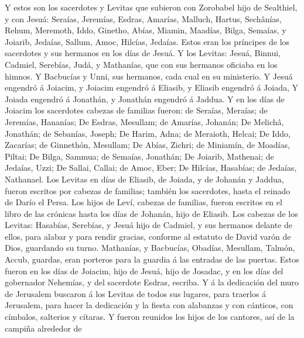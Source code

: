  Y estos son los sacerdotes y Levitas que subieron con
Zorobabel hijo de Sealthiel, y con Jesuá: Seraías, Jeremías, Esdras,
 Amarías, Malluch, Hartus,  Sechânías, Rehum,
Meremoth,  Iddo, Ginetho, Abías,  Miamin,
Maadías, Bilga,  Semaías, y Joiarib, Jedaías, 
Sallum, Amoc, Hilcías, Jedaías. Estos eran los príncipes de los
sacerdotes y sus hermanos en los días de Jesuá.  Y los
Levitas: Jesuá, Binnui, Cadmiel, Serebías, Judá, y Mathanías, que con
sus hermanos oficiaba en los himnos.  Y Bacbucías y Unni,
sus hermanos, cada cual en su ministerio.  Y Jesuá engendró
á Joiacim, y Joiacim engendró á Eliasib, y Eliasib engendró á Joiada,
 Y Joiada engendró á Jonathán, y Jonathán engendró á
Jaddua.  Y en los días de Joiacim los sacerdotes cabezas de
familias fueron: de Seraías, Meraías; de Jeremías, Hananías;
 De Esdras, Mesullam; de Amarías, Johanán;  De
Melichâ, Jonathán; de Sebanías, Joseph;  De Harim, Adna; de
Meraioth, Helcai;  De Iddo, Zacarías; de Ginnethón,
Mesullam;  De Abías, Zichri; de Miniamín, de Moadías,
Piltai;  De Bilga, Sammua; de Semaías, Jonathán;
 De Joiarib, Mathenai; de Jedaías, Uzzi;  De
Sallai, Callai; de Amoc, Eber;  De Hilcías, Hasabías; de
Jedaías, Nathanael.  Los Levitas en días de Eliasib, de
Joiada, y de Johanán y Jaddua, fueron escritos por cabezas de familias;
también los sacerdotes, hasta el reinado de Darío el Persa.
 Los hijos de Leví, cabezas de familias, fueron escritos en
el libro de las crónicas hasta los días de Johanán, hijo de Eliasib.
 Los cabezas de los Levitas: Hasabías, Serebías, y Jesuá
hijo de Cadmiel, y sus hermanos delante de ellos, para alabar y para
rendir gracias, conforme al estatuto de David varón de Dios, guardando
su turno.  Mathanías, y Bacbucías, Obadías, Mesullam,
Talmón, Accub, guardas, eran porteros para la guardia á las entradas de
las puertas.  Estos fueron en los días de Joiacim, hijo de
Jesuá, hijo de Josadac, y en los días del gobernador Nehemías, y del
sacerdote Esdras, escriba.  Y á la dedicación del muro de
Jerusalem buscaron á los Levitas de todos sus lugares, para traerlos á
Jerusalem, para hacer la dedicación y la fiesta con alabanzas y con
cánticos, con címbalos, salterios y cítaras.  Y fueron
reunidos los hijos de los cantores, así de la campiña alrededor de
